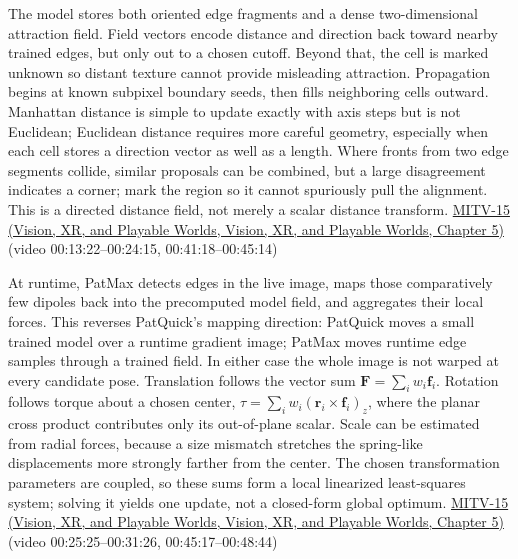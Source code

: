 The model stores both oriented edge fragments and a dense two-dimensional attraction field. Field vectors encode distance and direction back toward nearby trained edges, but only out to a chosen cutoff. Beyond that, the cell is marked unknown so distant texture cannot provide misleading attraction. Propagation begins at known subpixel boundary seeds, then fills neighboring cells outward. Manhattan distance is simple to update exactly with axis steps but is not Euclidean; Euclidean distance requires more careful geometry, especially when each cell stores a direction vector as well as a length. Where fronts from two edge segments collide, similar proposals can be combined, but a large disagreement indicates a corner; mark the region so it cannot spuriously pull the alignment. This is a directed distance field, not merely a scalar distance transform. \href{../07-Vision-XR-and-Playable-Worlds/main.pdf\#nameddest=04-visual-computing-ii-ch036-mitv-15---alignment-patmax-distance-field-filtering-and-sub-sampling-us-7065262}{MITV-15 (Vision, XR, and Playable Worlds, Vision, XR, and Playable Worlds, Chapter 5)} (video 00:13:22--00:24:15, 00:41:18--00:45:14)

At runtime, PatMax detects edges in the live image, maps those comparatively few dipoles back into the precomputed model field, and aggregates their local forces. This reverses PatQuick's mapping direction: PatQuick moves a small trained model over a runtime gradient image; PatMax moves runtime edge samples through a trained field. In either case the whole image is not warped at every candidate pose. Translation follows the vector sum \(\mathbf{F}=\sum_i w_i\mathbf{f}_i\). Rotation follows torque about a chosen center, \(\tau=\sum_i w_i(\mathbf{r}_i\times\mathbf{f}_i)_z\), where the planar cross product contributes only its out-of-plane scalar. Scale can be estimated from radial forces, because a size mismatch stretches the spring-like displacements more strongly farther from the center. The chosen transformation parameters are coupled, so these sums form a local linearized least-squares system; solving it yields one update, not a closed-form global optimum. \href{../07-Vision-XR-and-Playable-Worlds/main.pdf\#nameddest=04-visual-computing-ii-ch036-mitv-15---alignment-patmax-distance-field-filtering-and-sub-sampling-us-7065262}{MITV-15 (Vision, XR, and Playable Worlds, Vision, XR, and Playable Worlds, Chapter 5)} (video 00:25:25--00:31:26, 00:45:17--00:48:44)

